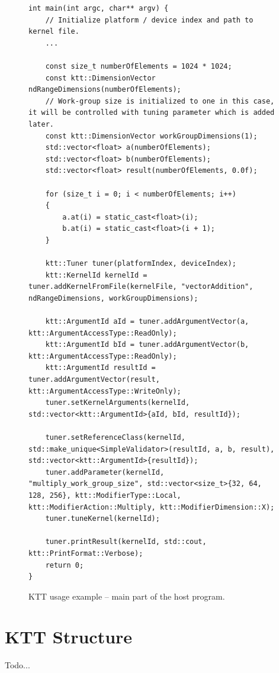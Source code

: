 \documentclass
[
    digital, %
    oneside, %
    table, %
    nolof, %
    nolot, %
    nocover %
]{fithesis3}
\begin{document}
\begin{figure}
\footnotesize
\begin{adjustwidth}{-1cm}{-1cm}
\begin{lstlisting}
int main(int argc, char** argv) {
    // Initialize platform / device index and path to kernel file.
    ...
    
    const size_t numberOfElements = 1024 * 1024;
    const ktt::DimensionVector ndRangeDimensions(numberOfElements);
    // Work-group size is initialized to one in this case, it will be controlled with tuning parameter which is added later.
    const ktt::DimensionVector workGroupDimensions(1);
    std::vector<float> a(numberOfElements);
    std::vector<float> b(numberOfElements);
    std::vector<float> result(numberOfElements, 0.0f);
    
    for (size_t i = 0; i < numberOfElements; i++)
    {
        a.at(i) = static_cast<float>(i);
        b.at(i) = static_cast<float>(i + 1);
    }
    
    ktt::Tuner tuner(platformIndex, deviceIndex);
    ktt::KernelId kernelId = tuner.addKernelFromFile(kernelFile, "vectorAddition", ndRangeDimensions, workGroupDimensions);
    
    ktt::ArgumentId aId = tuner.addArgumentVector(a, ktt::ArgumentAccessType::ReadOnly);
    ktt::ArgumentId bId = tuner.addArgumentVector(b, ktt::ArgumentAccessType::ReadOnly);
    ktt::ArgumentId resultId = tuner.addArgumentVector(result, ktt::ArgumentAccessType::WriteOnly);
    tuner.setKernelArguments(kernelId, std::vector<ktt::ArgumentId>{aId, bId, resultId});
    
    tuner.setReferenceClass(kernelId, std::make_unique<SimpleValidator>(resultId, a, b, result), std::vector<ktt::ArgumentId>{resultId});
    tuner.addParameter(kernelId, "multiply_work_group_size", std::vector<size_t>{32, 64, 128, 256}, ktt::ModifierType::Local, ktt::ModifierAction::Multiply, ktt::ModifierDimension::X);
    tuner.tuneKernel(kernelId);
    
    tuner.printResult(kernelId, std::cout, ktt::PrintFormat::Verbose);
    return 0;
}
\end{lstlisting}
\caption{KTT usage example -- main part of the host program.}
\label{ktt-api-usage}
\end{adjustwidth}
\end{figure}

\chapter{KTT Structure}
\label{ktt-structure}
Todo...
\end{document}

